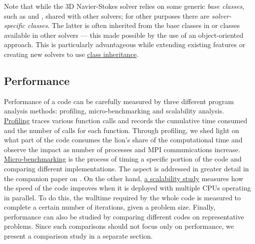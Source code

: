\documentclass{../jors}
\begin{document}
Note that while the 3D Navier-Stokes solver relies on some generic \emph{base
classes}, such as  and
, shared with other solvers; for other
purposes there are \emph{solver-specific classes}.  The latter is often inherited
from the base classes in  or classes available in other
solvers --- this made possible by the use of an object-oriented approach.  This is
particularly advantageous while extending existing features or creating new
solvers to use
\href{https://docs.python.org/3/tutorial/classes.html#inheritance}{%
class inheritance}.



\subsection*{Performance}

%
%

Performance of a code can be carefully measured by three different program
analysis methods: profiling, micro-benchmarking and scalability analysis.
%
\href{https://en.wikipedia.org/wiki/Profiling_(computer_programming)}{Profiling}
traces various function calls and records the cumulative time consumed and the
number of calls for each function.  Through profiling, we shed light on what
part of the code consumes the lion's share of the computational time and
observe the impact as number of processes and MPI communications increase.
%
\href{https://en.wiktionary.org/wiki/microbenchmark}{Micro-benchmarking} is the
process of timing a specific portion of the code and comparing different
implementations.  The aspect is addressed in greater detail in the companion
paper on  \citep{fluidfft}.
%
On the other hand,
\href{https://en.wikipedia.org/wiki/Scalability#Performance_tuning_versus_hardware_scalability}{a
scalability study} measures how the speed of the code improves when it is deployed
with multiple CPUs operating in parallel.  To do this, the walltime required by
the whole code is measured to complete a certain number of iterations, given a
problem size.
%
Finally, performance can also be studied by comparing different codes on
representative problems. Since such comparisons should not focus only on
performance, we present a comparison study in a separate section.
\end{document}
